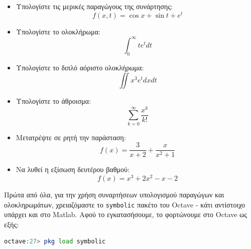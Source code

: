 \documentclass{article}
\begin{document}
\begin{itemize}
        \item Υπολογίστε τις μερικές παραγώγους της συνάρτησης:
                \[f(x, t) = \cos x + \sin t + e^t\]
        \item Υπολογίστε το ολοκλήρωμα:
                \[\int_{0}^{\infty} te^tdt\]
        \item Υπολογίστε το διπλό αόριστο ολοκλήρωμα:
                \[\iint x^3e^tdxdt\]
        \item Υπολογίστε το άθροισμα:
                \[\sum_{k = 0}^{\infty} \frac{x^k}{k!}\]
        \item Μετατρέψτε σε ρητή την παράσταση:
                \[f(x) = \frac{3}{x+2} + \frac{x}{x^2+1}\]
        \item Να λυθεί η εξίσωση δευτέρου βαθμού:
                \[f(x) = x^3 + 2x^2 - x - 2\]
\end{itemize}

Πρώτα από όλα, για την χρήση συναρτήσεων υπολογισμού παραγώγων και ολοκληρωμάτων,
χρειαζόμαστε το \lstinline{symbolic} πακέτο του Octave - κάτι αντίστοιχο υπάρχει
και στο Matlab. Αφού το εγκατασήσουμε, το φορτώνουμε στο Octave ως εξής:

\begin{lstlisting}[language=octave]
        octave:27> pkg load symbolic
\end{lstlisting}
\end{document}
